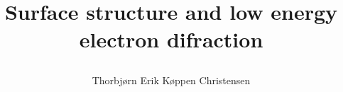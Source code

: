 
\title{\centering\parbox{\linewidth}{Surface structure and low energy electron difraction}}
\author{Thorbjørn Erik Køppen Christensen}



\maketitle[width=65cm]



